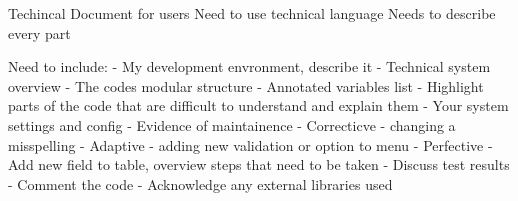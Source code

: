 Techincal Document for users
Need to use technical language
Needs to describe every part

Need to include:
- My development envronment, describe it
- Technical system overview
- The codes modular structure
- Annotated variables list
- Highlight parts of the code that are difficult to understand and explain them
- Your system settings and config
- Evidence of maintainence 
	- Correcticve - changing a misspelling
	- Adaptive - adding new validation or option to menu
	- Perfective - Add new field to table, overview steps that need to be
		       taken
- Discuss test results
- Comment the code
- Acknowledge any external libraries used
